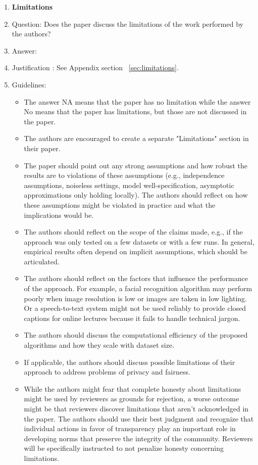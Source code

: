 \documentclass{article}
\begin{document}
\begin{enumerate}
\item {\bf Limitations}
    \item[] Question: Does the paper discuss the limitations of the work performed by the authors?
    \item[] Answer: \answerYes{} %
    \item[] Justification : See Appendix section ~\ref{sec:limitations}.
    \item[] Guidelines:
    \begin{itemize}
        \item The answer NA means that the paper has no limitation while the answer No means that the paper has limitations, but those are not discussed in the paper. 
        \item The authors are encouraged to create a separate "Limitations" section in their paper.
        \item The paper should point out any strong assumptions and how robust the results are to violations of these assumptions (e.g., independence assumptions, noiseless settings, model well-specification, asymptotic approximations only holding locally). The authors should reflect on how these assumptions might be violated in practice and what the implications would be.
        \item The authors should reflect on the scope of the claims made, e.g., if the approach was only tested on a few datasets or with a few runs. In general, empirical results often depend on implicit assumptions, which should be articulated.
        \item The authors should reflect on the factors that influence the performance of the approach. For example, a facial recognition algorithm may perform poorly when image resolution is low or images are taken in low lighting. Or a speech-to-text system might not be used reliably to provide closed captions for online lectures because it fails to handle technical jargon.
        \item The authors should discuss the computational efficiency of the proposed algorithms and how they scale with dataset size.
        \item If applicable, the authors should discuss possible limitations of their approach to address problems of privacy and fairness.
        \item While the authors might fear that complete honesty about limitations might be used by reviewers as grounds for rejection, a worse outcome might be that reviewers discover limitations that aren't acknowledged in the paper. The authors should use their best judgment and recognize that individual actions in favor of transparency play an important role in developing norms that preserve the integrity of the community. Reviewers will be specifically instructed to not penalize honesty concerning limitations.
    \end{itemize}


\end{enumerate}
\end{document}
